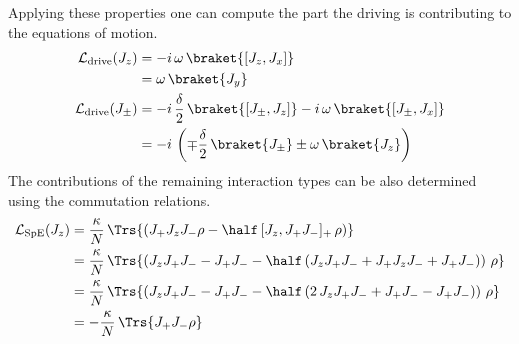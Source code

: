\begin{appendices}
    Applying these properties one can compute the part the driving is contributing to the equations of motion.
    \begin{align*}
        \mathcal{L}_\text{drive}(J_z)&=-i\,\omega\,\braket{[J_z,J_x]}\\
        &=\omega\,\braket{J_y}\\
        \mathcal{L}_\text{drive}(J_\pm)&=-i\,\frac{\delta}{2}\,\braket{[J_\pm,J_z]}-i\,\omega\,\braket{[J_\pm,J_x]}\\
        &=-i\,\left(\mp\frac{\delta}{2}\, \braket{J_\pm} \pm \omega\, \braket{J_z}\right)
    \end{align*}
    The contributions of the remaining interaction types can be also determined using the commutation relations.
    \begin{align*}
        \mathcal{L}_\text{SpE}(J_z)&=\frac{\kappa}{N}\,\Trs{\left(J_+ J_z J_- \rho-\half\,[J_z,J_+ J_-]_+\,\rho\right)}\\
        &=\frac{\kappa}{N}\,\Trs{\left(J_z J_+ J_- - J_+ J_- -\half\,(J_z J_+ J_- + J_+ J_z J_- + J_+ J_-)\right)\,\rho}\\
        &=\frac{\kappa}{N}\,\Trs{\left(J_z J_+ J_- - J_+ J_- -\half\,(2\,J_z J_+ J_- + J_+ J_- - J_+ J_-)\right)\,\rho}\\
        &=-\frac{\kappa}{N}\,\Trs{J_+ J_- \rho}
    \end{align*}


\end{appendices}
